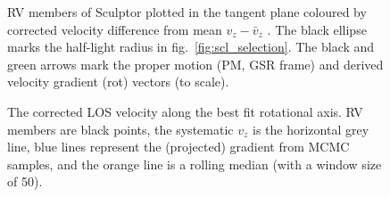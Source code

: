 \begin{figure}
\centering
{}
\caption[Scl velocity sample]{RV members of Sculptor plotted in the
tangent plane coloured by corrected velocity difference from mean
\(v_z - \bar v_z\) . The black ellipse marks the half-light radius in
fig.~\ref{fig:scl_selection}. The black and green arrows mark the proper
motion (PM, GSR frame) and derived velocity gradient (rot) vectors (to
scale).}
\end{figure}

\begin{figure}
\centering
{}
\caption[Scl velocity gradient]{The corrected LOS velocity along the
best fit rotational axis. RV members are black points, the systematic
\(v_z\) is the horizontal grey line, blue lines represent the
(projected) gradient from MCMC samples, and the orange line is a rolling
median (with a window size of 50).}
\end{figure}

